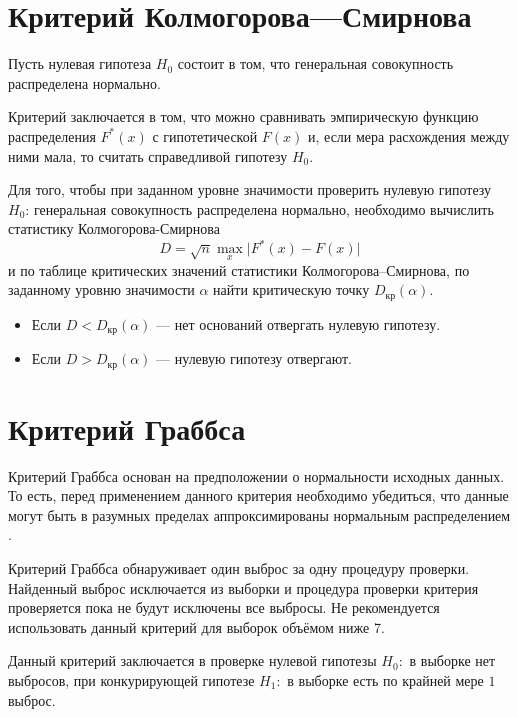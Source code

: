 
\section*{Критерий Колмогорова---Смирнова} %
\label{sec:kolm_smirn}

Пусть нулевая гипотеза $H_0$ состоит в том, что генеральная совокупность распределена нормально.

Критерий заключается в том, что можно сравнивать эмпирическую функцию распределения $F^{*}(x)$ с гипотетической $F(x)$ и, если мера расхождения между ними мала, то считать справедливой гипотезу $H_0$.

Для того, чтобы при заданном уровне значимости проверить нулевую гипотезу $H_0$: генеральная совокупность распределена нормально, необходимо вычислить статистику Колмогорова-Смирнова 
\begin{equation*}
	D = \sqrt{n}\max_{x} \vert F^{*}(x) - F(x) \vert 
\end{equation*}
и по таблице критических значений статистики Колмогорова--Смирнова, по заданному уровню значимости $\alpha$ найти критическую точку $D_{\textrm{кр}}(\alpha)$.
\begin{itemize}
	\item Если $D < D_{\textrm{кр}}(\alpha)$ --- нет оснований отвергать нулевую гипотезу.
	\item Если $D > D_{\textrm{кр}}(\alpha)$ --- нулевую гипотезу отвергают.
\end{itemize}


\section*{Критерий Граббса} %
\label{sec:grabbs}

Критерий Граббса основан на предположении о нормальности исходных данных. То есть, перед применением данного критерия необходимо убедиться, что данные могут быть в разумных пределах аппроксимированы нормальным распределением \cite{grubbs}.

Критерий Граббса обнаруживает один выброс за одну процедуру проверки. Найденный выброс исключается из выборки и процедура проверки критерия проверяется пока не будут исключены все выбросы. Не рекомендуется использовать данный критерий для выборок объёмом ниже 7.

Данный критерий заключается в проверке нулевой гипотезы $H_0:$ в выборке нет выбросов, при конкурирующей гипотезе $H_1:$ в выборке есть по крайней мере $1$ выброс.

